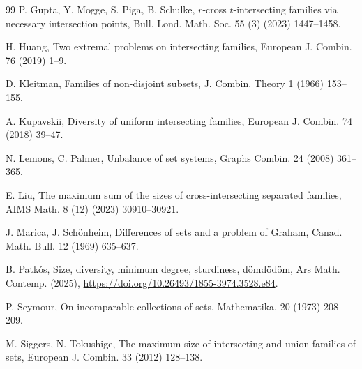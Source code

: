 \documentclass[11pt]{article}
\begin{document}
\begin{thebibliography}{99}
P. Gupta, Y. Mogge, S. Piga, B. Schulke,  
$r$-cross $t$-intersecting families via necessary intersection points, 
Bull. Lond. Math. Soc. 55 (3) (2023) 1447--1458.


H. Huang, Two extremal problems on intersecting families, European J. Combin. 76 (2019) 1--9.

 D. Kleitman, Families of non-disjoint subsets, 
 J. Combin. Theory 1 (1966) 153--155.


 A. Kupavskii, 
 Diversity of uniform intersecting families, 
European J. Combin. 74 (2018) 39--47.

 N. Lemons, C. Palmer, 
 Unbalance of set systems, 
 Graphs Combin. 24 (2008) 361--365.
 
E. Liu, 
The maximum sum of the sizes of cross-intersecting separated families, 
AIMS Math. 8 (12) (2023) 30910--30921.

 J. Marica, J. Sch\"{o}nheim, Differences of sets and a problem of Graham, Canad. Math. Bull. 12 (1969) 635--637.

B. Patk\'{o}s, 
Size, diversity, minimum degree, sturdiness, d\"{o}md\"{o}d\"{o}m, Ars Math. Contemp. (2025), \url{https://doi.org/10.26493/1855-3974.3528.e84}. 


P. Seymour, On incomparable collections of sets, Mathematika, 20 (1973) 208--209.

M. Siggers, N. Tokushige, The maximum size of intersecting and union families of sets, European J. Combin. 33 (2012) 128--138.










\end{thebibliography}
\end{document}
